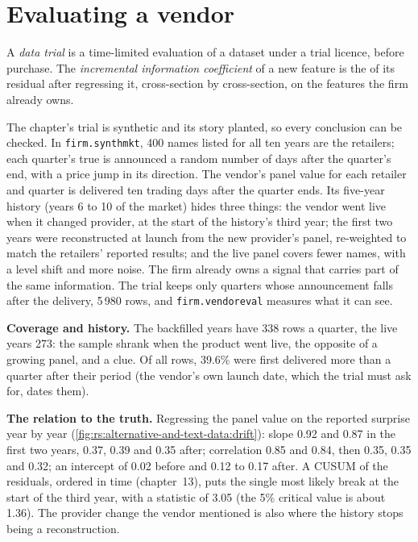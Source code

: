 \section{Evaluating a vendor}

\begin{definition}\label{def:rs:alternative-and-text-data:trial}
A \emph{data trial} is a time-limited evaluation of a dataset under a trial licence, before purchase. The
\emph{incremental information coefficient} of a new feature is the  of its residual after regressing it, cross-section by cross-section, on the features the firm already owns.
\end{definition}

The chapter's trial is synthetic and its story planted, so every conclusion can be checked. In \texttt{firm.synthmkt}, 400 names
listed for all ten years are the retailers; each quarter's true  is announced a random number of days after the
quarter's end, with a price jump in its direction. The vendor's panel value for each retailer and quarter is delivered ten trading days
after the quarter ends. Its five-year history (years 6 to 10 of the market) hides three things: the vendor went live when it changed
provider, at the start of the history's third year; the first two years were reconstructed at launch from the new provider's panel,
re-weighted to match the retailers' reported results; and the live panel covers fewer names, with a level shift and more noise. The firm
already owns a signal that carries part of the same information. The trial keeps only quarters whose announcement falls after the
delivery, 5\,980 rows, and \texttt{firm.vendoreval} measures what it can see.

\textbf{Coverage and history.} The backfilled years have 338 rows a quarter, the live years 273: the sample shrank when the product went
live, the opposite of a growing panel, and a clue. Of all rows, 39.6\% were first delivered more than a quarter after their period (the
vendor's own launch date, which the trial must ask for, dates them).

\textbf{The relation to the truth.} Regressing the panel value on the reported surprise year by year
(\cref{fig:rs:alternative-and-text-data:drift}): slope 0.92 and 0.87 in the first two years, 0.37, 0.39 and 0.35 after; correlation
0.85 and 0.84, then 0.35, 0.35 and 0.32; an intercept of 0.02 before and 0.12 to 0.17 after. A CUSUM of the residuals, ordered in time (chapter~13),
puts the single most likely break at the start of the third year, with a statistic of 3.05 (the 5\% critical value is about 1.36). The
provider change the vendor mentioned is also where the history stops being a reconstruction.

